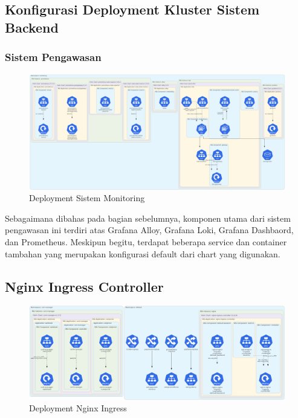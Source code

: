 \subsection{Konfigurasi Deployment Kluster Sistem Backend}

\subsubsection{Sistem Pengawasan}

\begin{figure}[htbp]
    \centering
    \includegraphics[width=1\textwidth]{resources/chapter-4/monitoring.png}
    \caption{Deployment Sistem Monitoring}
    \label{fig:deployment-monitoring}
\end{figure}

Sebagaimana dibahas pada bagian sebelumnya, komponen utama dari sistem pengawasan ini terdiri atas Grafana Alloy, Grafana Loki, Grafana Dashbaord, dan Prometheus. Meskipun begitu, terdapat beberapa service dan container tambahan yang merupakan konfigurasi default dari chart yang digunakan.

\pagebreak

\subsection{Nginx Ingress Controller}

\begin{figure}[htbp]
    \centering
    \includegraphics[width=1\textwidth]{resources/chapter-4/nginx.png}
    \caption{Deployment Nginx Ingress}
    \label{fig:deployment-nginx}
\end{figure}

